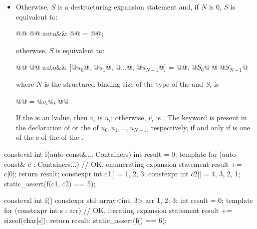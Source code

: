 \begin{itemize}
\item
Otherwise, $S$ is a destructuring expansion statement and,
if $N$ is $0$, $S$ is equivalent to:
\begin{codeblock}
{
  @@
  @@ auto&& @@ = @@;
}
\end{codeblock}
otherwise, $S$ is equivalent to:
\begin{codeblock}
{
  @@
  @@ auto&& [@$u_{0}$@, @$u_{1}$@, @$\dotsc$@, @$u_{N-1}$@] = @@;
  @$S_{0}$@
  @\vdots@
  @$S_{N-1}$@
}
\end{codeblock}
where $N$ is the structured binding size of the type
of the  and $S_{i}$ is
\begin{codeblock}
{
  @@ = @$v_{i}$@;
  @@
}
\end{codeblock}
If the  is an lvalue, then
$v_{i}$ is $u_{i}$;
otherwise, $v_{i}$ is .
The keyword  is present in
the declaration of  or
the 
of $u_{0}, u_{1}, \dotsc, u_{N-1}$, respectively,
if and only if
 is one of the s
of the 
of the .
\end{itemize}

\pnum
\begin{example}
\begin{codeblock}
consteval int f(auto const&... Containers) {
  int result = 0;
  template for (auto const& c : {Containers...}) {      // OK, enumerating expansion statement
    result += c[0];
  }
  return result;
}
constexpr int c1[] = {1, 2, 3};
constexpr int c2[] = {4, 3, 2, 1};
static_assert(f(c1, c2) == 5);
\end{codeblock}
\end{example}

\pnum
\begin{example}
\begin{codeblock}
consteval int f() {
  constexpr std::array<int, 3> arr {1, 2, 3};
  int result = 0;
  template for (constexpr int s : arr) {                // OK, iterating expansion statement
    result += sizeof(char[s]);
  }
  return result;
}
static_assert(f() == 6);
\end{codeblock}
\end{example}

